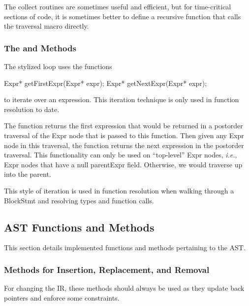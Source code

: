 \documentclass[10pt]{article}
\newcommand{\ie}{\emph{i.e.}}
\begin{document}
The collect routines are sometimes useful and efficient, but for
time-critical sections of code, it is sometimes better to define a
recursive function that calls the traversal macro
 directly.

\subsubsection{The  and  Methods}
\label{sec:resolveiteration}

The stylized loop  uses the functions
\begin{clang}
Expr* getFirstExpr(Expr* expr);
Expr* getNextExpr(Expr* expr);
\end{clang}
to iterate over an expression.  This iteration technique is only used
in function resolution to date.

The function  returns the first expression that would
be returned in a postorder traversal of the Expr node that is passed
to this function.  Then given any Expr node in this traversal, the
function  returns the next expression in the postorder
traversal.  This functionality can only be used on ``top-level'' Expr
nodes, \ie, Expr nodes that have a null parentExpr field.  Otherwise,
we would traverse up into the parent.

This style of iteration is used in function resolution when walking
through a BlockStmt and resolving types and function calls.

\subsection{AST Functions and Methods}

This section details implemented functions and methods pertaining to
the AST.

\subsubsection{Methods for Insertion, Replacement, and Removal}
\label{sec:inserts}

For changing the IR, these methods should always be used as they
update back pointers and enforce some constraints.
\end{document}
